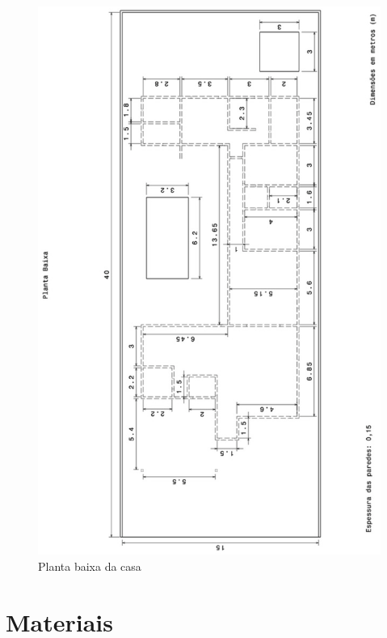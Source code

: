 \begin{figure}[H]
  \begin{center}
	\includegraphics[keepaspectratio,scale=0.45,angle=270]{figuras/planta_baixa.eps}
	\caption{Planta baixa da casa}
  \end{center}
\end{figure}











\section{Materiais}


